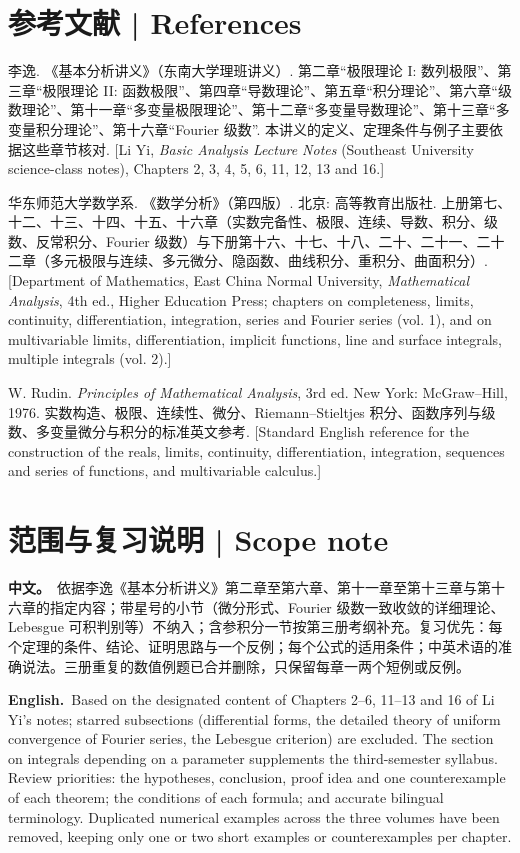 \documentclass[UTF8,11pt,a4paper]{ctexart}
\newcommand{\BOTH}[2]{\par\noindent\textbf{中文。}\ #1\par\noindent\textbf{English.}\ #2\par}
\begin{document}
\section*{参考文献 | References}
\begin{enumerate}[label={[\arabic*]},leftmargin=2.4em]
\item 李逸. 《基本分析讲义》（东南大学理班讲义）. 第二章“极限理论 I: 数列极限”、第三章“极限理论 II: 函数极限”、第四章“导数理论”、第五章“积分理论”、第六章“级数理论”、第十一章“多变量极限理论”、第十二章“多变量导数理论”、第十三章“多变量积分理论”、第十六章“Fourier 级数”. 本讲义的定义、定理条件与例子主要依据这些章节核对. [Li Yi, \emph{Basic Analysis Lecture Notes} (Southeast University science-class notes), Chapters 2, 3, 4, 5, 6, 11, 12, 13 and 16.]
\item 华东师范大学数学系. 《数学分析》（第四版）. 北京: 高等教育出版社. 上册第七、十二、十三、十四、十五、十六章（实数完备性、极限、连续、导数、积分、级数、反常积分、Fourier 级数）与下册第十六、十七、十八、二十、二十一、二十二章（多元极限与连续、多元微分、隐函数、曲线积分、重积分、曲面积分）. [Department of Mathematics, East China Normal University, \emph{Mathematical Analysis}, 4th ed., Higher Education Press; chapters on completeness, limits, continuity, differentiation, integration, series and Fourier series (vol. 1), and on multivariable limits, differentiation, implicit functions, line and surface integrals, multiple integrals (vol. 2).]
\item W. Rudin. \emph{Principles of Mathematical Analysis}, 3rd ed. New York: McGraw--Hill, 1976. 实数构造、极限、连续性、微分、Riemann--Stieltjes 积分、函数序列与级数、多变量微分与积分的标准英文参考. [Standard English reference for the construction of the reals, limits, continuity, differentiation, integration, sequences and series of functions, and multivariable calculus.]
\end{enumerate}

\section*{范围与复习说明 | Scope note}
\BOTH{依据李逸《基本分析讲义》第二章至第六章、第十一章至第十三章与第十六章的指定内容；带星号的小节（微分形式、Fourier 级数一致收敛的详细理论、Lebesgue 可积判别等）不纳入；含参积分一节按第三册考纲补充。复习优先：每个定理的条件、结论、证明思路与一个反例；每个公式的适用条件；中英术语的准确说法。三册重复的数值例题已合并删除，只保留每章一两个短例或反例。}{Based on the designated content of Chapters 2--6, 11--13 and 16 of Li Yi's notes; starred subsections (differential forms, the detailed theory of uniform convergence of Fourier series, the Lebesgue criterion) are excluded. The section on integrals depending on a parameter supplements the third-semester syllabus. Review priorities: the hypotheses, conclusion, proof idea and one counterexample of each theorem; the conditions of each formula; and accurate bilingual terminology. Duplicated numerical examples across the three volumes have been removed, keeping only one or two short examples or counterexamples per chapter.}
\end{document}
